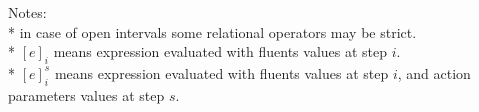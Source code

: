 \documentclass{article}
\begin{document}
Notes: \\
* in case of open intervals some relational operators may be strict.\\
* $[e]_i$ means expression evaluated with fluents values at step $i$.\\
* $[e]_i^s$ means expression evaluated with fluents values at step $i$, and action parameters values at step $s$.
\end{document}
